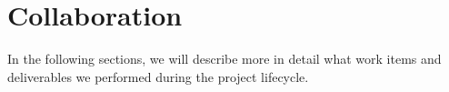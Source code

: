 \section{Collaboration}


In the following sections, we will describe more in detail what work items and deliverables we performed during the project lifecycle.